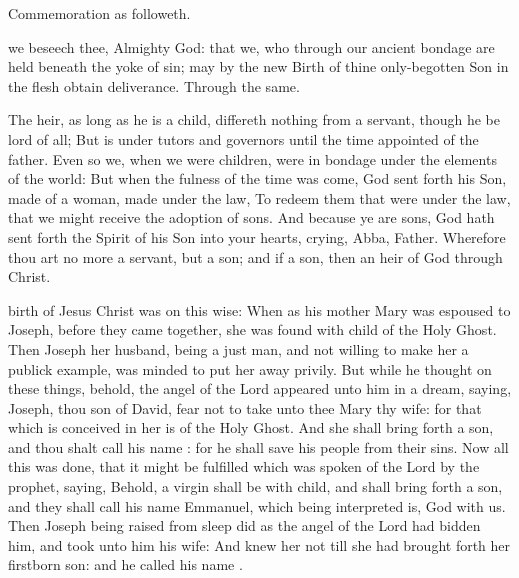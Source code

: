 \begin{rubric}
    Commemoration  as followeth.
\end{rubric}

 we beseech thee, Almighty God: that we, who through our ancient bondage are held beneath the yoke of sin; may by the new Birth of thine only-begotten Son in the flesh obtain deliverance. Through the same.

 The heir, as long as he is a child, differeth nothing from a servant, though he be lord of all; But is under tutors and governors until the time appointed of the father. Even so we, when we were children, were in bondage under the elements of the world: But when the fulness of the time was come, God sent forth his Son, made of a woman, made under the law, To redeem them that were under the law, that we might receive the adoption of sons. And because ye are sons, God hath sent forth the Spirit of his Son into your hearts, crying, Abba, Father. Wherefore thou art no more a servant, but a son; and if a son, then an heir of God through Christ.

 birth of Jesus Christ was on this wise: When as his mother Mary was espoused to Joseph, before they came together, she was found with child of the Holy Ghost. Then Joseph her husband, being a just man, and not willing to make her a publick example, was minded to put her away privily. But while he thought on these things, behold, the angel of the Lord appeared unto him in a dream, saying, Joseph, thou son of David, fear not to take unto thee Mary thy wife: for that which is conceived in her is of the Holy Ghost. And she shall bring forth a son, and thou shalt call his name : for he shall save his people from their sins. Now all this was done, that it might be fulfilled which was spoken of the Lord by the prophet, saying, Behold, a virgin shall be with child, and shall bring forth a son, and they shall call his name Emmanuel, which being interpreted is, God with us. Then Joseph being raised from sleep did as the angel of the Lord had bidden him, and took unto him his wife: And knew her not till she had brought forth her firstborn son: and he called his name .

